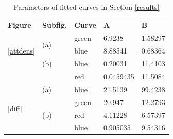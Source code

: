 \documentclass[a4paper,12pt,twoside]{report}
\begin{document}
\begin{table}[tp]
\centering
\begin{tabular}{|l|l|l|l|l|}
\hline
Figure & Subfig. & Curve & A & B \\ \hline
\multirow{3}{*}{\ref{attdens}} & \multirow{2}{*}{(a)} & green & 6.9238 & 1.58297 \\
 							& 					   & blue & 8.88541 & 0.68364 \\ \cline{2-5}	
 							& (b)				   & blue & 0.20031 & 11.4103 \\ 
 							&    				   & red & 0.0459435 & 11.5084 \\ \hline
 							\multirow{4}{*}{\ref{diff}} & (a)				   & blue & 21.5139 & 99.4238 \\ \cline{2-5}	
 							& \multirow{3}{*}{(b)} & green & 20.947 & 12.2793 \\
 							& 					   & red & 4.11228 & 6.57397 \\ 
 							& 					   & blue & 0.905035 & 9.54316 \\ \hline
\end{tabular}
\caption{Parameters of fitted curves in Section \ref{results}}
\end{table}





\clearpage

\listoffigures
\clearpage

\listoftables
\clearpage



\end{document}
